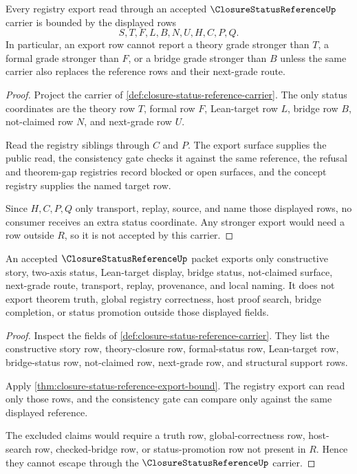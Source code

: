 \begin{theorem}
\label{thm:closure-status-reference-export-bound}
Every registry export read through an accepted $\ClosureStatusReferenceUp$ carrier is bounded by the displayed rows
$$
S,T,F,L,B,N,U,H,C,P,Q.
$$
In particular, an export row cannot report a theory grade stronger than $T$, a formal grade stronger than $F$, or a bridge grade stronger than $B$ unless the same carrier also replaces the reference rows and their next-grade route.
\end{theorem}
\begin{proof}
Project the carrier of \autoref{def:closure-status-reference-carrier}. The only status coordinates are the theory row $T$, formal row $F$, Lean-target row $L$, bridge row $B$, not-claimed row $N$, and next-grade row $U$.

Read the registry siblings through $C$ and $P$. The export surface supplies the public read, the consistency gate checks it against the same reference, the refusal and theorem-gap registries record blocked or open surfaces, and the concept registry supplies the named target row.

Since $H,C,P,Q$ only transport, replay, source, and name those displayed rows, no consumer receives an extra status coordinate. Any stronger export would need a row outside $R$, so it is not accepted by this carrier.
\end{proof}

\begin{theorem}
\label{thm:closure-status-reference-nonescape}
An accepted $\ClosureStatusReferenceUp$ packet exports only constructive story, two-axis status, Lean-target display, bridge status, not-claimed surface, next-grade route, transport, replay, provenance, and local naming. It does not export theorem truth, global registry correctness, host proof search, bridge completion, or status promotion outside those displayed fields.
\end{theorem}
\begin{proof}
Inspect the fields of \autoref{def:closure-status-reference-carrier}. They list the constructive story row, theory-closure row, formal-status row, Lean-target row, bridge-status row, not-claimed row, next-grade row, and structural support rows.

Apply \autoref{thm:closure-status-reference-export-bound}. The registry export can read only those rows, and the consistency gate can compare only against the same displayed reference.

The excluded claims would require a truth row, global-correctness row, host-search row, checked-bridge row, or status-promotion row not present in $R$. Hence they cannot escape through the $\ClosureStatusReferenceUp$ carrier.
\end{proof}

